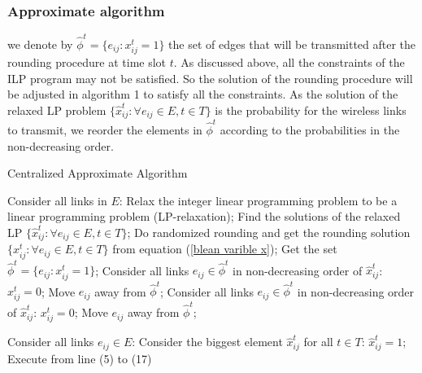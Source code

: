 \documentclass[conference]{IEEEtran}
\begin{document}
\subsubsection{Approximate algorithm}
we denote by $\hat{\phi}^t=\{e_{ij}:x_{ij}^t=1\}$ the set of edges
that will be transmitted after the rounding procedure at time slot
$t$. As discussed above, all the constraints of the ILP program may
not be satisfied. So the solution of the rounding procedure will be
adjusted in algorithm 1 to satisfy all the constraints. As the
solution of the relaxed LP problem $\{\hat{x}_{ij}^t:\forall
e_{ij}\in E,t\in T\}$ is the probability for the wireless links to
transmit, we reorder the elements in $\hat{\phi}^t$ according to the
probabilities in the non-decreasing order.
\begin{algorithm}[!tb]
\caption{Centralized Approximate Algorithm} \label{Centralized
algorithm}
\begin{algorithmic}[1]
\STATE Consider all links in $E$:
\STATE Relax the integer linear programming problem to be a linear programming problem
(LP-relaxation);
\STATE Find the solutions of the relaxed LP
$\{\hat{x}_{ij}^t:\forall e_{ij}\in E,t\in T\}$;
\STATE Do randomized rounding and get the rounding solution
$\{x_{ij}^t:
\forall e_{ij}\in E,t\in T\}$ from equation (\ref{blean
varible x});
 \STATE Get the set
$\hat{\phi}^t=\{e_{ij}:x_{ij}^t=1\}$;
\STATE Consider all links $e_{ij}\in \hat{\phi}^t$ in non-decreasing order of
$\hat{x}_{ij}^t$:
\STATE $x_{ij}^t=0$;
\STATE Move $e_{ij}$ away from
$\hat{\phi}^t$;
\ENDIF
\STATE Consider all links $e_{ij}\in
\hat{\phi}^t$ in non-decreasing order of $\hat{x}_{ij}^t$:
\STATE $x_{ij}^t=0$;
\STATE Move $e_{ij}$ away from
$\hat{\phi}^t$;
\ENDIF
\ENDFOR

\STATE Consider all links $e_{ij}\in E$:
 
\STATE Consider the biggest element $\hat{x}_{ij}^t$ for all $t\in T$:
\STATE $\hat{x}_{ij}^t=1$;
\STATE Execute from line (5) to (17)
\ENDIF
\ENDFOR

\end{algorithmic}
\end{algorithm}
\end{document}
